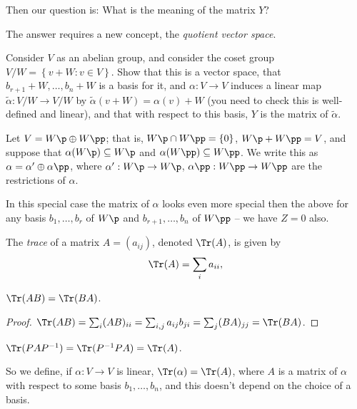 Then our question is: What is the meaning of the matrix $Y$?

The answer requires a new concept, the \emph{quotient vector space}.

\begin{exercise}
	Consider $V$ as an abelian group, and consider the coset group $V/W=\left\{v+W:v\in V\right\}$. Show that this is a vector space, that $b_{r+1}+W,\ldots,b_n+W$ is a basis for it, and $\alpha:V\to V$ induces a linear map $\widetilde{\alpha}:V/W \to V/W$ by $\widetilde{\alpha}(v+W) = \alpha(v)+W$ (you need to check this is well-defined and linear), and that with respect to this basis, $Y$ is the matrix of $\widetilde{\alpha}$. %
\end{exercise}

\begin{remark}
	Let $V=W\p\oplus W\pp$; that is, $W\p\cap W\pp = \{0\}$, $W\p+W\pp=V$, and suppose that  $\alpha(W\p) \subseteq W\p$ and $\alpha(W\pp)\subseteq W\pp$. We write this as $\alpha=\alpha'\oplus\alpha\pp$, where $\alpha':W\p\to W\p$, $\alpha\pp:W\pp\to W\pp$ are the restrictions of $\alpha$.  %

	In this special case the matrix of $\alpha$ looks even more special then the above for any basis $b_1,\ldots,b_r$ of $W\p$ and $b_{r+1},\ldots,b_n$ of $W\pp$ -- we have $Z=0$ also. %
\end{remark}

\begin{definition}
	The \emph{trace} of a matrix $A=(a_{ij})$, denoted $\Tr(A)$, is given by
	\begin{equation*}
		\Tr(A)=\sum_i a_{ii},
	\end{equation*}
\end{definition}

\begin{lemma}
	$\Tr(AB)=\Tr(BA)$. %
\end{lemma}

\begin{proof}
	$\Tr(AB) = \sum_i (AB)_{ii} = \sum_{i,j} a_{ij} b_{ji} = \sum_j (BA)_{jj} = \Tr(BA)$. %
\end{proof}
\begin{corollary}
	$\Tr(PAP^{-1}) = \Tr(P^{-1} PA) = \Tr(A)$. %
\end{corollary}
\vspace{-6pt}
So we define, if $\alpha:V\to V$ is linear, $\Tr(\alpha)=\Tr(A)$, where $A$ is a matrix of $\alpha$ with respect to some basis $b_1,\ldots,b_n$, and  this doesn't depend on the choice of a basis.

